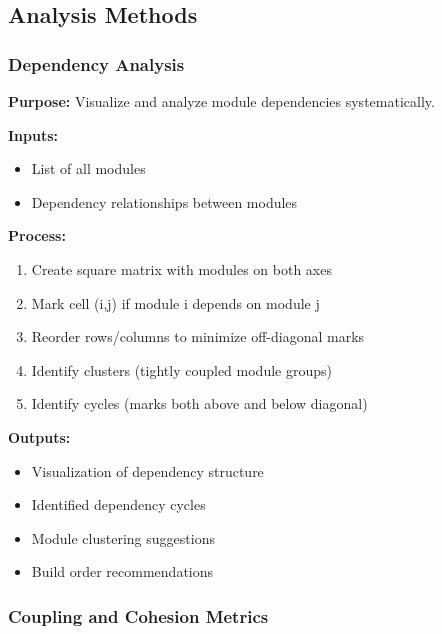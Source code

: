 \documentclass[11pt,letterpaper]{article}
\begin{document}
\subsection{Analysis Methods}

\subsubsection{Dependency Analysis}

\begin{definitionbox}
\textbf{Purpose:} Visualize and analyze module dependencies systematically.

\textbf{Inputs:}
\begin{itemize}[nosep]
    \item List of all modules
    \item Dependency relationships between modules
\end{itemize}

\textbf{Process:}
\begin{enumerate}[nosep]
    \item Create square matrix with modules on both axes
    \item Mark cell (i,j) if module i depends on module j
    \item Reorder rows/columns to minimize off-diagonal marks
    \item Identify clusters (tightly coupled module groups)
    \item Identify cycles (marks both above and below diagonal)
\end{enumerate}

\textbf{Outputs:}
\begin{itemize}[nosep]
    \item Visualization of dependency structure
    \item Identified dependency cycles
    \item Module clustering suggestions
    \item Build order recommendations
\end{itemize}
\end{definitionbox}

\subsubsection{Coupling and Cohesion Metrics}
\end{document}
